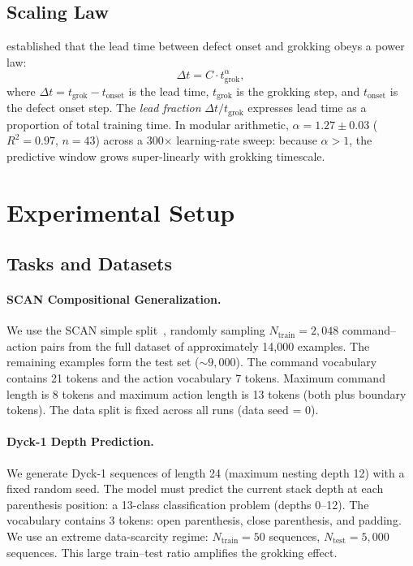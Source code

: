 \documentclass[11pt]{article}
\newcommand{\grokstep}{t_{\text{grok}}}
\newcommand{\onsetstep}{t_{\text{onset}}}
\newcommand{\leadtime}{\Delta t}
\begin{document}
\subsection{Scaling Law}
\label{sec:scaling_def}

\citet{xu2026integrability} established that the lead time between defect onset and grokking obeys a power law:
\begin{equation}
  \leadtime = C \cdot \grokstep^\alpha,
  \label{eq:scaling_law}
\end{equation}
where $\leadtime = \grokstep - \onsetstep$ is the lead time, $\grokstep$ is the grokking step, and $\onsetstep$ is the defect onset step. The \emph{lead fraction} $\leadtime / \grokstep$ expresses lead time as a proportion of total training time. In modular arithmetic, $\alpha = 1.27 \pm 0.03$ ($R^2 = 0.97$, $n = 43$) across a 300$\times$ learning-rate sweep: because $\alpha > 1$, the predictive window grows super-linearly with grokking timescale.


\section{Experimental Setup}
\label{sec:setup}

\subsection{Tasks and Datasets}

\paragraph{SCAN Compositional Generalization.}
We use the SCAN simple split~\citep{lake2018generalization}, randomly sampling $N_{\text{train}} = 2{,}048$ command--action pairs from the full dataset of approximately 14,000 examples. The remaining examples form the test set (${\sim}9{,}000$). The command vocabulary contains 21 tokens and the action vocabulary 7 tokens. Maximum command length is 8 tokens and maximum action length is 13 tokens (both plus boundary tokens). The data split is fixed across all runs (data seed = 0).

\paragraph{Dyck-1 Depth Prediction.}
We generate Dyck-1 sequences of length 24 (maximum nesting depth 12) with a fixed random seed. The model must predict the current stack depth at each parenthesis position: a 13-class classification problem (depths 0--12). The vocabulary contains 3 tokens: open parenthesis, close parenthesis, and padding. We use an extreme data-scarcity regime: $N_{\text{train}} = 50$ sequences, $N_{\text{test}} = 5{,}000$ sequences. This large train--test ratio amplifies the grokking effect.
\end{document}
